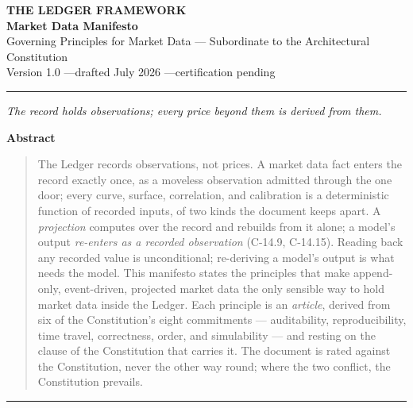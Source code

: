 \documentclass[11pt,a4paper]{article}
\begin{document}
\begin{center}
  {\LARGE\bfseries THE LEDGER FRAMEWORK}\\[0.9em]
  {\large\bfseries Market Data Manifesto}\\[0.6em]
  {\normalsize Governing Principles for Market Data ---
   Subordinate to the Architectural Constitution}\\[1.4em]
  Version 1.0 \quad---\quad drafted July 2026 \quad---\quad certification pending
\end{center}

\vspace{0.6em}
\begin{center}\rule{0.35\linewidth}{0.4pt}\end{center}
\vspace{0.6em}

\begin{center}\itshape
The record holds observations; every price beyond them is derived from them.
\end{center}

\vspace{0.4em}

\begin{center}\textbf{Abstract}\end{center}
\begin{quote}
The Ledger records observations, not prices. A market data fact enters
the record exactly once, as a moveless observation admitted through the
one door; every curve, surface, correlation, and calibration is a
deterministic function of recorded inputs, of two kinds the document
keeps apart. A \emph{projection} computes over the record and rebuilds
from it alone; a model's output \emph{re-enters as a recorded
observation} (C-14.9, C-14.15). Reading back any recorded value is
unconditional; re-deriving a model's output is what needs the model. This
manifesto states the principles that make
append-only, event-driven, projected market data the only sensible way
to hold market data inside the Ledger.
Each principle is an \emph{article}, derived from six of the
Constitution's eight commitments --- auditability, reproducibility, time
travel, correctness, order, and simulability --- and resting on the
clause of the Constitution that carries it. The document is rated
against the Constitution, never the other way round; where the two
conflict, the Constitution prevails.
\end{quote}

\vspace{0.4em}
\begin{center}\rule{0.35\linewidth}{0.4pt}\end{center}
\vspace{0.6em}
\end{document}
